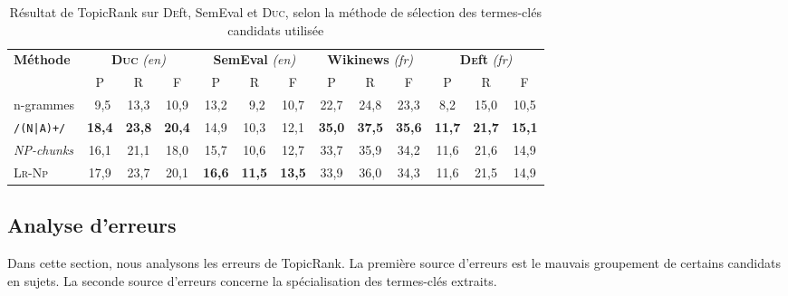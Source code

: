         \begin{table}
          \centering
          \begin{tabular}{l|c@{~~}c@{~~}c@{~}|c@{~~}c@{~~}c@{~}|c@{~~}c@{~~}c@{~}|c@{~~}c@{~~}c@{~}}
            \toprule
            \multirow{2}{*}[-2pt]{\textbf{Méthode}} & \multicolumn{3}{c|}{\textbf{\textsc{Duc}} \textit{(en)}} & \multicolumn{3}{c|}{\textbf{SemEval} \textit{(en)}} & \multicolumn{3}{c|}{\textbf{Wikinews} \textit{(fr)}} & \multicolumn{3}{c}{\textbf{\textsc{De}ft} \textit{(fr)}}\\
            \cline{2-4}\cline{5-7}\cline{8-10}\cline{11-13}
            & P & R & F & P & R & F & P & R & F & P & R & F\\
            \hline
            n-grammes & $~~$9,5 & 13,3 & 10,9 & 13,2 & $~~$9,2 & 10,7 & 22,7 & 24,8 & 23,3 & 8,2 & 15,0 & 10,5\\
            \texttt{/(N|A)+/} & \textbf{18,4} & \textbf{23,8} & \textbf{20,4} & 14,9 & 10,3 & 12,1 & \textbf{35,0} & \textbf{37,5} & \textbf{35,6} & \textbf{11,7} & \textbf{21,7} & \textbf{15,1}\\
            \textit{NP-chunks} & 16,1 & 21,1 & 18,0 & 15,7 & 10,6 & 12,7 & 33,7 & 35,9 & 34,2 & 11,6 & 21,6 & 14,9\\
            \textsc{Lr-Np} & 17,9 & 23,7 & 20,1 & \textbf{16,6} & \textbf{11,5} & \textbf{13,5} & 33,9 & 36,0 & 34,3 & 11,6 & 21,5 & 14,9\\
            \bottomrule
          \end{tabular}
          \caption{
            Résultat de TopicRank sur \textsc{De}ft, SemEval et \textsc{Duc},
            selon la méthode de sélection des termes-clés candidats utilisée
            \label{tab:topicrank_candidate_selection}
          }
        \end{table}

      \subsection{Analyse d'erreurs}
      \label{subsec:main:domain_independent_keyphrase_extraction-unsupervised_automatic_keyphrase_extraction-error_analysis}
        Dans cette section, nous analysons les erreurs de TopicRank. La première
        source d'erreurs est le mauvais groupement de certains candidats en
        sujets. La seconde source d'erreurs concerne la spécialisation des
        termes-clés extraits.

